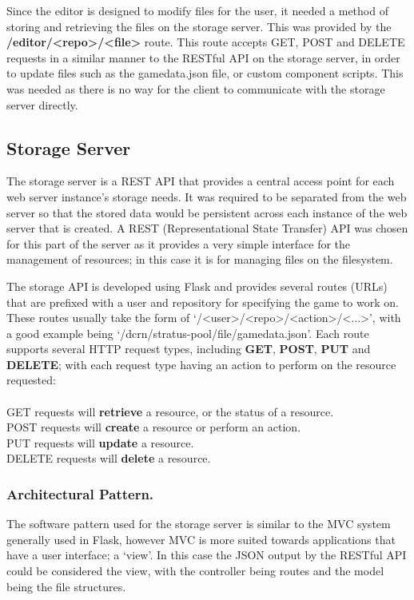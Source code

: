 	Since the editor is designed to modify files for the user, it needed a method of storing and retrieving the files on the storage server. This was provided by the \textbf{/editor/<repo>/<file>} route. This route accepts GET, POST and DELETE requests in a similar manner to the RESTful API on the storage server, in order to update files such as the gamedata.json file, or custom component scripts. This was needed as there is no way for the client to communicate with the storage server directly.

	\subsection{Storage Server}
	\label{subsection:devstorageserver}

	The storage server is a REST API that provides a central access point for each web server instance's storage needs. It was required to be separated from the web server so that the stored data would be persistent across each instance of the web server that is created. A REST (Representational State Transfer) API was chosen for this part of the server as it provides a very simple interface for the management of resources; in this case it is for managing files on the filesystem. 

	The storage API is developed using Flask and provides several routes (URLs) that are prefixed with a user and repository for specifying the game to work on. These routes usually take the form of `/<user>/<repo>/<action>/<...>', with a good example being `/dcrn/stratus-pool/file/gamedata.json'. Each route supports several HTTP request types, including \textbf{GET}, \textbf{POST}, \textbf{PUT} and \textbf{DELETE}; with each request type having an action to perform on the resource requested:
	\\
	~\\
	GET requests will \textbf{retrieve} a resource, or the status of a resource.\\
	POST requests will \textbf{create} a resource or perform an action.\\
	PUT requests will \textbf{update} a resource.\\
	DELETE requests will \textbf{delete} a resource.\\

	\subsubsection{Architectural Pattern.}
	The software pattern used for the storage server is similar to the MVC system generally used in Flask, however MVC is more suited towards applications that have a user interface; a `view'. In this case the JSON output by the RESTful API could be considered the view, with the controller being routes and the model being the file structures.

